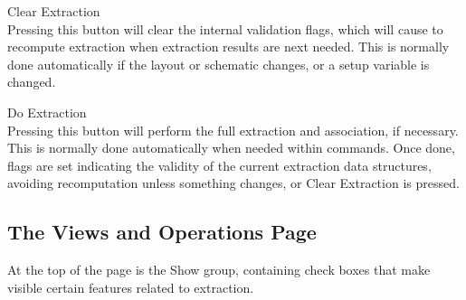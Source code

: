 \begin{description}
\item{\cb Clear Extraction}\\
Pressing this button will clear the internal validation flags, which
will cause {\Xic} to recompute extraction when extraction results are
next needed.  This is normally done automatically if the layout or
schematic changes, or a setup variable is changed.

\item{\cb Do Extraction}\\
Pressing this button will perform the full extraction and association,
if necessary.  This is normally done automatically when needed within
commands.  Once done, flags are set indicating the validity of the
current extraction data structures, avoiding recomputation unless
something changes, or {\cb Clear Extraction} is pressed.
\end{description}

\subsection{The {\cb Views and Operations} Page}

At the top of the page is the {\cb Show} group, containing check boxes
that make visible certain features related to extraction.


